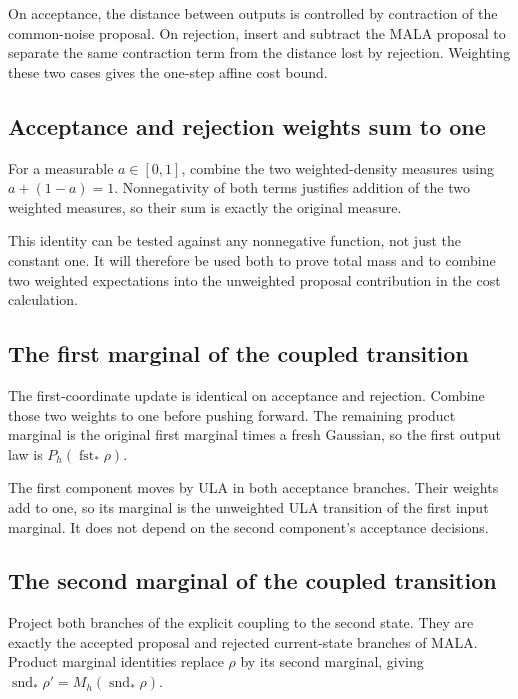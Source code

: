 \documentclass[11pt,a4paper]{article}
\begin{document}
On acceptance, the distance between outputs is controlled by contraction of the common-noise proposal. On rejection, insert and subtract the MALA proposal to separate the same contraction term from the distance lost by rejection. Weighting these two cases gives the one-step affine cost bound.


\subsection{\texorpdfstring{Acceptance and rejection weights sum to one}{Acceptance and rejection weights sum to one}}


For a measurable \(a\in[0,1]\), combine the two weighted-density measures using \(a+(1-a)=1\). Nonnegativity of both terms justifies addition of the two weighted measures, so their sum is exactly the original measure.



This identity can be tested against any nonnegative function, not just the constant one. It will therefore be used both to prove total mass and to combine two weighted expectations into the unweighted proposal contribution in the cost calculation.


\subsection{\texorpdfstring{The first marginal of the coupled transition}{The first marginal of the coupled transition}}


The first-coordinate update is identical on acceptance and rejection. Combine those two weights to one before pushing forward. The remaining product marginal is the original first marginal times a fresh Gaussian, so the first output law is \(P_h(\operatorname{fst}_*\rho)\).



The first component moves by ULA in both acceptance branches. Their weights add to one, so its marginal is the unweighted ULA transition of the first input marginal. It does not depend on the second component's acceptance decisions.


\subsection{\texorpdfstring{The second marginal of the coupled transition}{The second marginal of the coupled transition}}


Project both branches of the explicit coupling to the second state. They are exactly the accepted proposal and rejected current-state branches of MALA. Product marginal identities replace \(\rho\) by its second marginal, giving \(\operatorname{snd}_*\rho'=M_h(\operatorname{snd}_*\rho)\).
\end{document}

